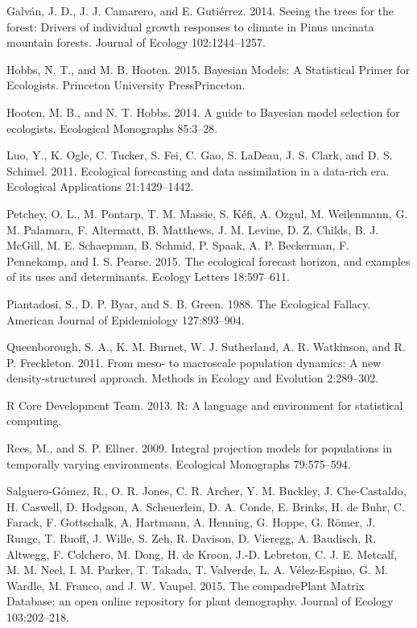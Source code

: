 \documentclass[12pt,]{article}
\begin{document}
Galván, J. D., J. J. Camarero, and E. Gutiérrez. 2014. Seeing the trees
for the forest: Drivers of individual growth responses to climate in
Pinus uncinata mountain forests. Journal of Ecology 102:1244--1257.

Hobbs, N. T., and M. B. Hooten. 2015. Bayesian Models: A Statistical
Primer for Ecologists. Princeton University PressPrinceton.

Hooten, M. B., and N. T. Hobbs. 2014. A guide to Bayesian model
selection for ecologists. Ecological Monographs 85:3--28.

Luo, Y., K. Ogle, C. Tucker, S. Fei, C. Gao, S. LaDeau, J. S. Clark, and
D. S. Schimel. 2011. Ecological forecasting and data assimilation in a
data-rich era. Ecological Applications 21:1429--1442.

Petchey, O. L., M. Pontarp, T. M. Massie, S. Kéfi, A. Ozgul, M.
Weilenmann, G. M. Palamara, F. Altermatt, B. Matthews, J. M. Levine, D.
Z. Childs, B. J. McGill, M. E. Schaepman, B. Schmid, P. Spaak, A. P.
Beckerman, F. Pennekamp, and I. S. Pearse. 2015. The ecological forecast
horizon, and examples of its uses and determinants. Ecology Letters
18:597--611.

Piantadosi, S., D. P. Byar, and S. B. Green. 1988. The Ecological
Fallacy. American Journal of Epidemiology 127:893--904.

Queenborough, S. A., K. M. Burnet, W. J. Sutherland, A. R. Watkinson,
and R. P. Freckleton. 2011. From meso- to macroscale population
dynamics: A new density-structured approach. Methods in Ecology and
Evolution 2:289--302.

R Core Development Team. 2013. R: A language and environment for
statistical computing.

Rees, M., and S. P. Ellner. 2009. Integral projection models for
populations in temporally varying environments. Ecological Monographs
79:575--594.

Salguero-Gómez, R., O. R. Jones, C. R. Archer, Y. M. Buckley, J.
Che-Castaldo, H. Caswell, D. Hodgson, A. Scheuerlein, D. A. Conde, E.
Brinks, H. de Buhr, C. Farack, F. Gottschalk, A. Hartmann, A. Henning,
G. Hoppe, G. Römer, J. Runge, T. Ruoff, J. Wille, S. Zeh, R. Davison, D.
Vieregg, A. Baudisch, R. Altwegg, F. Colchero, M. Dong, H. de Kroon,
J.-D. Lebreton, C. J. E. Metcalf, M. M. Neel, I. M. Parker, T. Takada,
T. Valverde, L. A. Vélez-Espino, G. M. Wardle, M. Franco, and J. W.
Vaupel. 2015. The compadrePlant Matrix Database: an open online
repository for plant demography. Journal of Ecology 103:202--218.
\end{document}

